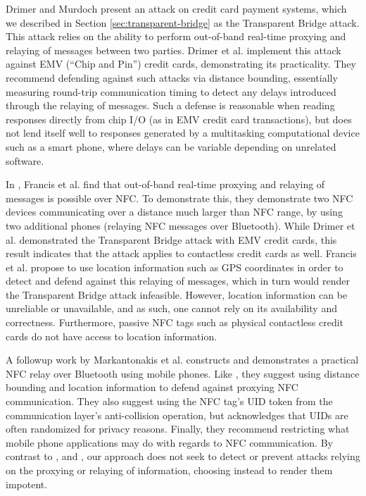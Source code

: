 Drimer and Murdoch \cite{Drimer:2007:KYE:1362903.1362910} present an attack on credit card payment systems,
    which we described in Section \ref{sec:transparent-bridge} as the Transparent Bridge attack.
This attack relies on the ability to perform out-of-band real-time proxying and relaying of messages between two parties.
Drimer et al. implement this attack against EMV (``Chip and Pin'') credit cards, demonstrating its practicality.
They recommend defending against such attacks via distance bounding,
    essentially measuring round-trip communication timing to detect any delays introduced through the relaying of messages.
Such a defense is reasonable when reading responses directly from chip I/O (as in EMV credit card transactions),
    but does not lend itself well to responses generated by a multitasking computational device such as a smart phone,
    where delays can be variable depending on unrelated software.

In \cite{francis2010practical}, Francis et al. find that out-of-band real-time proxying and relaying of messages is possible over NFC.
To demonstrate this, they demonstrate two NFC devices communicating over a distance much larger than NFC range,
    by using two additional phones (relaying NFC messages over Bluetooth).
While Drimer et al. demonstrated the Transparent Bridge attack with EMV credit cards,
    this result indicates that the attack applies to contactless credit cards as well.
Francis et al. propose to use location information such as GPS coordinates in order to detect and defend against this relaying of messages,
    which in turn would render the Transparent Bridge attack infeasible.
However, location information can be unreliable or unavailable, and as such, one cannot rely on its availability and correctness.
Furthermore, passive NFC tags such as physical contactless credit cards do not have access to location information.

A followup work by Markantonakis et al. \cite{markantonakis2012practical} constructs and demonstrates a practical NFC relay over Bluetooth using mobile phones.
Like \cite{francis2010practical}, they suggest using distance bounding and location information to defend against proxying NFC communication.
They also suggest using the NFC tag's UID token from the communication layer's anti-collision operation, but acknowledges that UIDs are often randomized for privacy reasons.
Finally, they recommend restricting what mobile phone applications may do with regards to NFC communication.
By contrast to \cite{francis2010practical}, \cite{markantonakis2012practical} and \cite{Drimer:2007:KYE:1362903.1362910},
    our approach does not seek to detect or prevent attacks relying on the proxying or relaying of information, choosing instead to render them impotent.

